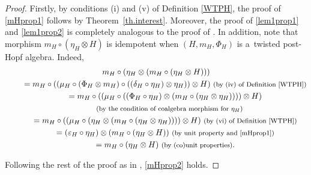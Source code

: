 \documentclass[pdftex]{sigma}
\numberwithin{equation}{section}
\begin{document}
\begin{proof}
Firstly, by conditions (i) and (v) of Definition \ref{WTPH}, the proof of \eqref{mHprop1} follows by Theorem~\ref{th.interest}. Moreover, the proof of \eqref{lem1prop1} and \eqref{lem1prop2} is completely analogous to the proof of \mbox{\cite[Lemma~3.4]{FGR}}.
In addition, note that morphism $m_{H}\circ(\eta_{H}\otimes H)$ is idempotent when $(H,m_{H},\Phi_{H})$ is a~twisted post-Hopf algebra. Indeed,
\begin{gather*}
 m_{H}\circ(\eta_{H}\otimes(m_{H}\circ(\eta_{H}\otimes H)))\\
 \qquad{}= m_{H}\circ((\mu_{H}\circ(\Phi_{H}\otimes m_{H})\circ ((\delta_{H}\circ\eta_{H})\otimes\eta_{H}))\otimes H)\ \text{\footnotesize\textnormal{(by (iv) of Definition \ref{WTPH})}}\\
 \qquad{}= m_{H}\circ((\mu_{H}\circ((\Phi_{H}\circ\eta_{H})\otimes(m_{H}\circ(\eta_{H}\otimes\eta_{H}))))\otimes H)\\
 \qquad\quad{}\
 \text{\footnotesize\textnormal{(by the condition of coalgebra morphism for $\eta_{H}$)}}\\
 \qquad{}= m_{H}\circ((\mu_{H}\circ(\eta_{H}\otimes(m_{H}\circ(\eta_{H}\otimes\eta_{H}))))\otimes H)\ \text{\footnotesize\textnormal{(by (vi) of Definition \ref{WTPH})}}\\
 \qquad{}= (\varepsilon_{H}\circ\eta_{H})\otimes(m_{H}\circ(\eta_{H}\otimes H))\ \text{\footnotesize\textnormal{(by unit property and \eqref{mHprop1})}}\\
 \qquad{}= m_{H}\circ(\eta_{H}\otimes H)\ \text{\footnotesize\textnormal{(by (co)unit properties)}}.
\end{gather*}

Following the rest of the proof as in \cite[Lemma 3.5]{FGR}, \eqref{mHprop2} holds.
\end{proof}
\end{document}
